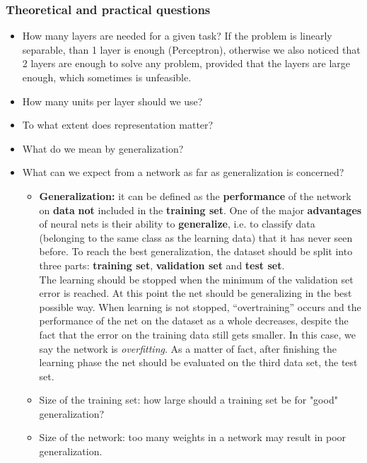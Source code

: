 \subsubsection{Theoretical and practical questions}
\begin{itemize}
	\item How many layers are needed for a given task? If the problem is linearly separable, than 1 layer is enough (Perceptron), otherwise we also noticed that 2 layers are enough to solve any problem, provided that the layers are large enough, which sometimes is unfeasible.
	\item How many units per layer should we use?
	\item To what extent does representation matter?
	\item What do we mean by generalization?
	\item What can we expect from a network as far as generalization is concerned?
	\begin{itemize}
		\item \textbf{Generalization:} it can be defined as the \textbf{performance} of the network on \textbf{data} \textbf{not} included in the \textbf{training set}. One of the major \textbf{advantages} of neural nets is their ability to \textbf{generalize}, i.e. to classify data (belonging to the same class as the learning data) that it has never seen before. To reach the best generalization, the dataset should be split into three parts: \textbf{training set}, \textbf{validation set} and \textbf{test set}.\\
		The learning should be stopped when the minimum of the validation set error is reached. At this point the net should be generalizing in the best possible way. When learning is not stopped, ``overtraining'' occurs and the performance of the net on the dataset as a whole decreases, despite the fact that the error on the training data still gets smaller. In this case, we say the network is \textit{overfitting}. As a matter of fact, after finishing the learning phase the net should be evaluated on the third data set, the test set.
		\item Size of the training set: how large should a training set be for "good" generalization?
		\item Size of the network: too many weights in a network may result in poor generalization.
	\end{itemize}
\end{itemize}

